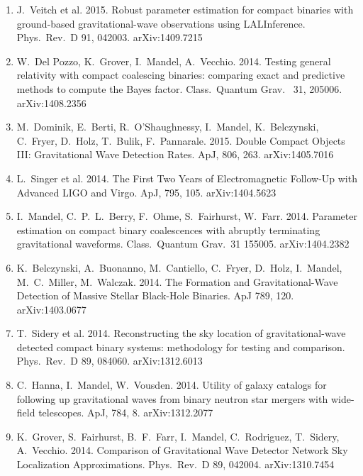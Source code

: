 \documentclass[margin,line]{res}
\begin{document}
\begin{resume}
\begin{enumerate}
\item  J.~Veitch et al. 2015. Robust parameter estimation for compact binaries with ground-based gravitational-wave observations using LALInference. Phys.~Rev.~D 91, 042003. arXiv:1409.7215

\item  W.~Del Pozzo, K.~Grover, I.~Mandel, A.~Vecchio. 2014.  Testing general relativity with compact coalescing binaries: comparing exact and predictive methods to compute the Bayes factor. Class.~Quantum Grav.~ 31, 205006. arXiv:1408.2356

\item  M.~Dominik, E.~Berti, R.~O'Shaughnessy, I.~Mandel, K.~Belczynski, C.~Fryer, D.~Holz, T.~Bulik,  F.~Pannarale. 2015. Double Compact Objects III: Gravitational Wave Detection Rates.  ApJ, 806, 263.  arXiv:1405.7016

\item  L.~Singer et al. 2014. The First Two Years of Electromagnetic Follow-Up with Advanced LIGO and Virgo.  ApJ, 795, 105. arXiv:1404.5623

\item  I.~Mandel, C.~P.~L.~Berry, F.~Ohme, S.~Fairhurst, W.~Farr.  2014. Parameter estimation on compact binary coalescences with abruptly terminating gravitational waveforms.  Class.~Quantum Grav.~31 155005. arXiv:1404.2382

\item  K.~Belczynski, A.~Buonanno, M.~Cantiello, C.~Fryer, D.~Holz, I.~Mandel, M.~C.~Miller, M.~Walczak.  2014. The Formation and Gravitational-Wave Detection of Massive Stellar Black-Hole Binaries.  ApJ 789, 120. arXiv:1403.0677

\item  T.~Sidery et al. 2014. Reconstructing the sky location of gravitational-wave detected compact binary systems: methodology for testing and comparison.  Phys.~Rev.~D 89, 084060.  arXiv:1312.6013

\item  C.~Hanna, I.~Mandel, W.~Vousden.  2014. Utility of galaxy catalogs for following up gravitational waves from binary neutron star mergers with wide-field telescopes. ApJ, 784, 8.  arXiv:1312.2077

\item  K.~Grover, S.~Fairhurst, B.~F.~Farr, I.~Mandel, C.~Rodriguez, T.~Sidery, A.~Vecchio.  2014.  Comparison of Gravitational Wave Detector Network Sky Localization Approximations.  Phys.~Rev.~D 89, 042004.  arXiv:1310.7454


\end{enumerate}
\end{resume}
\end{document}
